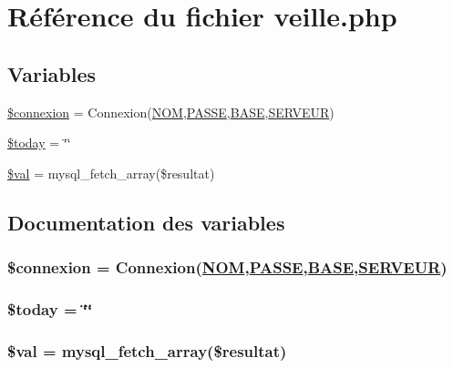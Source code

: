 \hypertarget{veille_8php}{
\section{R\'{e}f\'{e}rence du fichier veille.php}
\label{veille_8php}
}
\subsection*{Variables}
\begin{CompactItemize}
\item 
\hyperlink{veille_8php_a0}{\$connexion} = Connexion(\hyperlink{pma__connect_8php_a0}{NOM},\hyperlink{pma__connect_8php_a1}{PASSE},\hyperlink{pma__connect_8php_a3}{BASE},\hyperlink{pma__connect_8php_a2}{SERVEUR})
\item 
\hyperlink{veille_8php_a1}{\$today} = \char`\"{}\char`\"{}
\item 
\hyperlink{veille_8php_a2}{\$val} = mysql\_\-fetch\_\-array(\$resultat)
\end{CompactItemize}


\subsection{Documentation des variables}
\hypertarget{veille_8php_a0}{
\subsubsection[\$connexion]{\setlength{\rightskip}{0pt plus 5cm}\$connexion = Connexion(\hyperlink{pma__connect_8php_a0}{NOM},\hyperlink{pma__connect_8php_a1}{PASSE},\hyperlink{pma__connect_8php_a3}{BASE},\hyperlink{pma__connect_8php_a2}{SERVEUR})}}
\label{veille_8php_a0}


\hypertarget{veille_8php_a1}{
\subsubsection[\$today]{\setlength{\rightskip}{0pt plus 5cm}\$today = \char`\"{}\char`\"{}}}
\label{veille_8php_a1}


\hypertarget{veille_8php_a2}{
\subsubsection[\$val]{\setlength{\rightskip}{0pt plus 5cm}\$val = mysql\_\-fetch\_\-array(\$resultat)}}
\label{veille_8php_a2}


